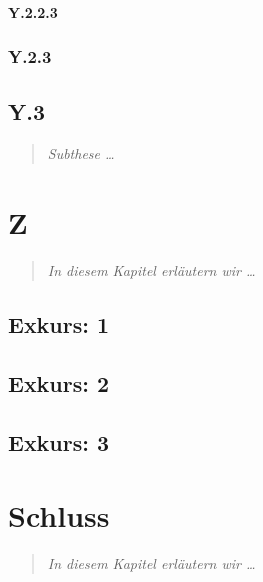 \documentclass[
  DIV=calc,
  BCOR=5mm,
  11pt,
  headings=small,
  oneside,
  abstract=true,
  toc=bib,
  english,ngerman]{scrbook}
\begin{document}
\subsubsection{Y.2.2.3}

\subsection{Y.2.3}

\section{Y.3}
\begin{quote}\itshape
Subthese \ldots
\end{quote} 

\chapter{Z}
\begin{quote}\itshape
In diesem Kapitel erläutern wir \ldots
\end{quote} 

\section{Exkurs: 1}

\section{Exkurs: 2}

\section{Exkurs: 3}

\chapter{Schluss}
\begin{quote}\itshape
In diesem Kapitel erläutern wir \ldots
\end{quote}

\small




\printnomenclature


\end{document}
